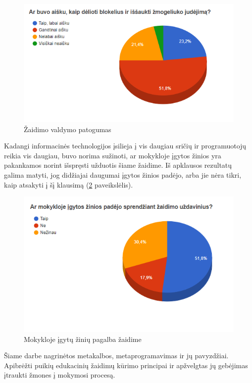 \documentclass{VUMIFPSkursinis}
\begin{document}
\begin{figure}[H]
\centering
\includegraphics[scale=0.8]{img/arAisku.png}
\caption{Žaidimo valdymo patogumas}
\label{img:arAisku}
\end{figure}

Kadangi informacinės technologijos įsilieja į vis daugiau sričių ir programuotojų reikia vis daugiau, buvo norima sužinoti, ar mokykloje įgytos žinios yra pakankamos norint išspręsti užduotis šiame žaidime. Iš apklausos rezultatų galima matyti, jog didžiajai daugumai įgytos žinios padėjo, arba jie nėra tikri, kaip atsakyti į šį klausimą (\ref{img:arZiniosPadejo} paveikslėlis).

\begin{figure}[H]
\centering
\includegraphics[scale=0.8]{img/arZiniosPadejo.png}
\caption{Mokykloje įgytų žinių pagalba žaidime}
\label{img:arZiniosPadejo}
\end{figure}

Šiame darbe nagrinėtos metakalbos, metaprogramavimas ir jų pavyzdžiai. Apibrėžti puikių edukacinių žaidimų kūrimo principai ir apžvelgtas jų gebėjimas įtraukti žmones į mokymosi procesą.
\end{document}
